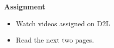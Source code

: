 \noindent
{\bf Assignment}
\begin{itemize}
\item Watch videos assigned on D2L   
\item Read the next two pages.
\end{itemize}

